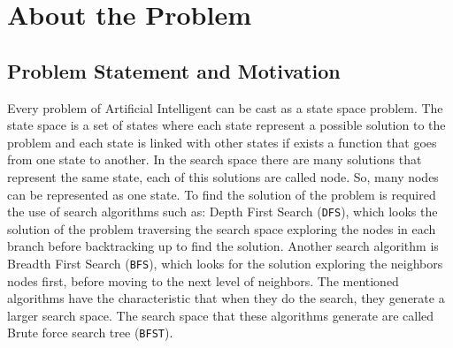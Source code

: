 

\chapter{About the Problem}\label{aboutTheProblem}

\iffalse
\chapterprecis{The purpose of this section if to motivate the problem.}\index{sinopse de capítulo}
\fi
\section{Problem Statement and Motivation}

\noindent
Every problem of Artificial Intelligent can be cast as a state space problem. The state space is a set of states where each state represent a possible solution to the problem and each state is linked with other states if exists a function that goes from one state to another. In the search space there are many solutions that represent the same state, each of this solutions are called node. So, many nodes can be represented as one state. To find the solution of the problem is required the use of search algorithms such as: Depth First Search (\texttt{DFS}), which looks the solution of the problem traversing the search space exploring the nodes in each branch before backtracking up to find the solution. Another search algorithm is Breadth First Search (\texttt{BFS}), which looks for the solution exploring the neighbors nodes first, before moving to the next level of neighbors. The mentioned algorithms have the characteristic that when they do the search, they generate a larger search space. The search space that these algorithms generate are called Brute force search tree (\texttt{BFST}). \\

